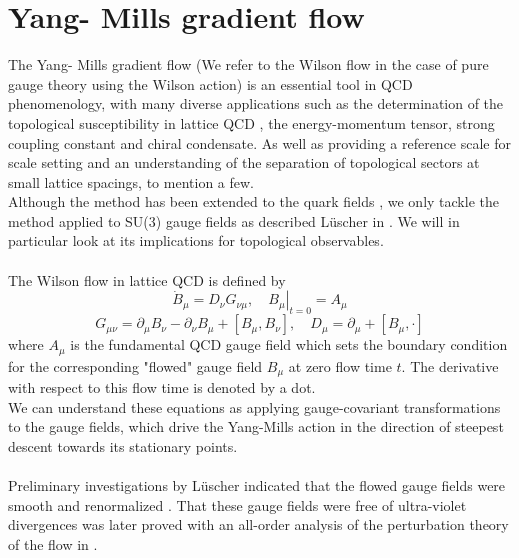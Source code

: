 \documentclass[a4paper,10pt]{book}
\begin{document}
\section{Yang- Mills gradient flow}
The Yang- Mills gradient flow (We refer to the Wilson flow in the case of pure gauge theory using the Wilson action) is an essential tool in QCD phenomenology, with many diverse applications such as the determination of the topological susceptibility in lattice QCD \cite{Luscher2010}, the energy-momentum tensor\cite{10.1093/ptep/ptt059}, strong coupling constant \cite{Luscher2010} and chiral condensate\cite{L_scher_2013}\cite{SHINDLER201471}. As well as providing a reference scale for scale setting and an understanding of the separation of topological sectors at small lattice spacings\cite{Luscher2010}, to mention a few.\\Although the method has been extended to the quark fields \cite{L_scher_2013}, we only tackle the method applied to SU(3) gauge fields as described Lüscher in \cite{Luscher2010}. We will in particular look at its implications for topological observables.\\\\The Wilson flow in lattice QCD is defined by
\begin{equation}\label{eq:flow1}
\dot{B}_{\mu}=D_{\nu} G_{\nu \mu},\left.\quad B_{\mu}\right|_{t=0}=A_{\mu}
\end{equation}
\begin{equation}\label{eq:flow2}
G_{\mu \nu}=\partial_{\mu} B_{\nu}-\partial_{\nu} B_{\mu}+\left[B_{\mu}, B_{\nu}\right], \quad D_{\mu}=\partial_{\mu}+\left[B_{\mu}, \cdot\right]
\end{equation}
where $A_\mu$ is the fundamental QCD gauge field which sets the boundary condition for the corresponding "flowed" gauge field $B_\mu$ at zero flow time $t$. The derivative with respect to this flow time is denoted by a dot.\\We can understand these equations as applying gauge-covariant transformations to the gauge fields, which drive the Yang-Mills action in the direction of steepest descent towards its stationary points.\\\\Preliminary investigations by Lüscher indicated that the flowed gauge fields were smooth and renormalized \cite{Luscher2010}. That these gauge fields were free of ultra-violet divergences was later proved with an all-order analysis of the perturbation theory of the flow in \cite{L_scher_2011}.
\end{document}
